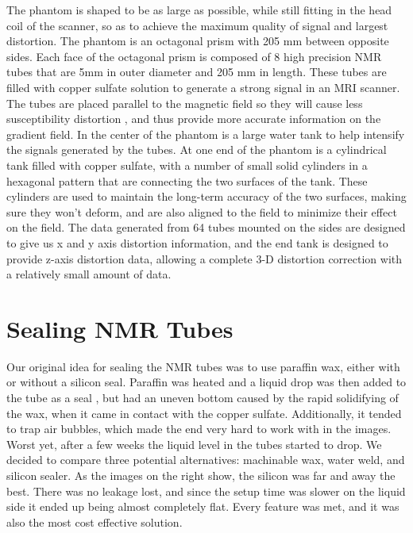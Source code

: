 The phantom is shaped to be as large as possible, while still fitting in the head coil of the scanner, so as
to achieve the maximum quality of signal and largest distortion. The phantom is an octagonal prism with 205 mm
between opposite sides.  Each face of the octagonal prism is composed of 8 high precision NMR tubes that are
5mm in outer diameter and 205 mm in length. These tubes are filled with copper sulfate solution to generate a
strong signal in an MRI scanner.  The tubes are placed parallel to the magnetic field so they will cause less
susceptibility distortion \cite{mag_susceptibility},
and thus provide more accurate information on the gradient field.  In the
center of the phantom is a large water tank to help intensify the signals generated by the tubes. At one end
of the phantom is a cylindrical tank filled with copper sulfate, with a number of small solid cylinders in a
hexagonal pattern that are connecting the two surfaces of the tank. These cylinders are used to maintain the
long-term accuracy of the two surfaces, making sure they won’t deform, and are also aligned to the field to
minimize their effect on the field.  The data generated from 64 tubes mounted on the sides are designed to
give us x and y axis distortion information, and the end tank is designed to provide z-axis distortion data,
allowing a complete 3-D distortion correction with a relatively small amount of data.

\section{Sealing NMR Tubes}

Our original idea for sealing the NMR tubes was to use paraffin wax, either with or without a silicon seal.
Paraffin was heated and a liquid drop was then added to the tube as a seal , but had an uneven bottom caused
by the rapid solidifying of the wax, when it came in contact with the copper sulfate.  Additionally,
it tended to trap air bubbles, which made the end very hard to work with in the images.  Worst yet, after a
few weeks the liquid level in the tubes started to drop.  We decided to compare three potential alternatives:
machinable wax, water weld, and silicon sealer.  As the images on the right show, the silicon was far and
away the best.  There was no leakage lost, and since the setup time was slower on the liquid side it ended
up being almost completely flat.  Every feature was met, and it was also the most cost effective solution.

